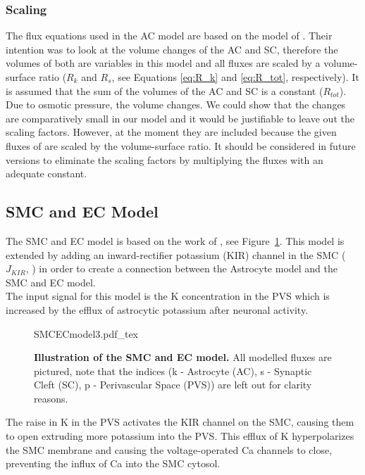 \subsubsection{Scaling}
The flux equations used in the AC model are based on the model of \citet{Ostby2009}. Their intention was to look at the volume changes of the AC and SC, therefore the volumes of both are variables in this model and all fluxes are scaled by a volume-surface ratio ($R_k$ and $R_s$, see Equations \ref{eq:R_k} and \ref{eq:R_tot}, respectively). It is assumed that the sum of the volumes of the AC and SC is a constant ($R_{tot}$). Due to osmotic pressure, the volume changes. We could show that the changes are comparatively small in our model and it would be justifiable to leave out the scaling factors. However, at the moment they are included because the given fluxes of \citet{Ostby2009} are scaled by the volume-surface ratio. It should be considered in future versions to eliminate the scaling factors by multiplying the fluxes with an adequate constant. 




\subsection{SMC and EC Model}
The SMC and EC model is based on the work of \citet{Koenigsberger2006}, see Figure~\ref{fig:SMCECmodel}. This model is extended by adding an inward-rectifier potassium (KIR) channel in the SMC ($ J_{KIR} $, \cite{Filosa2004}) in order to create a connection between the Astrocyte model and the SMC and EC model. \\%

The input signal for this model is the \gls{K} concentration in the PVS which is increased by the efflux of astrocytic potassium after neuronal activity. 
\begin{figure}[h!]
  \centering
  \def\svgwidth{450pt} %
  \scriptsize
  {SMCECmodel3.pdf_tex}
  \caption{\textbf{Illustration of the SMC and EC model.} All modelled fluxes are pictured, note that the indices (k - Astrocyte (AC), s - Synaptic Cleft (SC), p - Perivascular Space (PVS)) are left out for clarity reasons.}
\label{fig:SMCECmodel}
\end{figure}

The raise in \gls{K} in the PVS activates the KIR channel on the SMC, causing them to open extruding more potassium into the PVS. This efflux of \gls{K} hyperpolarizes the SMC membrane and causing the voltage-operated \gls{Ca} channels to close, preventing the influx of \gls{Ca} into the SMC cytosol.\\

